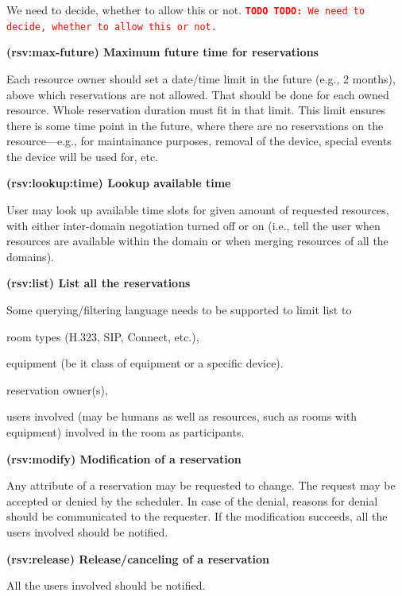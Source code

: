 \documentclass[a4paper]{report}
\makeatletter
\newcounter{UCcounter}
\newenvironment{UseCases}%
	{\begin{list}{\textbf{UC-\arabic{UCcounter}}}{\@nmbrlisttrue\def\@listctr{UCcounter}}}%
	{\end{list}}
\newcommand{\UClabel}[1]{\label{UC:#1}}
\newcommand{\UseCase}[2]{\item\UClabel{#2} \textbf{(#2) #1}\\ \nopagebreak}
\newcommand{\TODO}[1]{%
\def\empty{}%
\def\prvniparametr{#1}%
\ifx\prvniparametr\empty%
\begingroup\tt\textcolor{red}{\noindent\textbf{TODO}}\endgroup
\else%
\begingroup\tt\textcolor{red}{\noindent\textbf{TODO:}\ #1}\endgroup
\fi%
}
\makeatother
\begin{document}
\begin{UseCases}
\TODO{We need to decide, whether to allow this or not.}


\UseCase{Maximum future time for reservations}{rsv:max-future}

Each resource owner should set a date/time limit in the future (e.g., 2
months), above which reservations are not allowed. That should be done for each owned resource. Whole reservation duration
must fit in that limit. This limit ensures there is some time point in the
future, where there are no reservations on the resource---e.g., for
maintainance purposes, removal of the device, special events the device will be
used for, etc.


\UseCase{Lookup available time}{rsv:lookup:time}

User may look up available time slots for given amount of requested resources,
with either inter-domain negotiation turned off or on (i.e., tell the user when
resources are available within the domain or when merging resources of all the
domains).

\UseCase{List all the reservations}{rsv:list}

Some querying/filtering language needs to be supported to limit list to

\begin{compactitem}

\item room types (H.323, SIP, Connect, etc.),

\item equipment (be it class of equipment or a specific device).

\item reservation owner(s),

\item users involved (may be humans as well as resources, such as rooms with
equipment) involved in the room as participants.

\end{compactitem}

\UseCase{Modification of a reservation}{rsv:modify}

Any attribute of a reservation may be requested to change. The request may be
accepted or denied by the scheduler. In case of the denial, reasons for denial
should be communicated to the requester. If the modification succeeds, all the
users involved should be notified.

\UseCase{Release/canceling of a reservation}{rsv:release}

All the users involved should be notified.


\end{UseCases}
\end{document}
